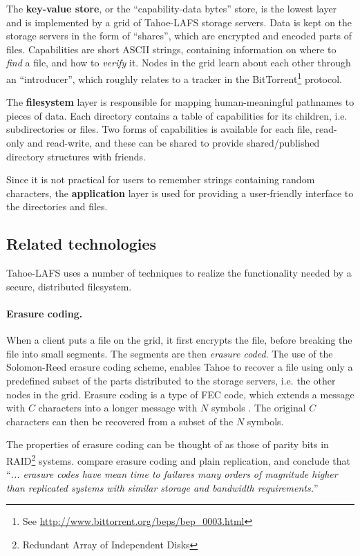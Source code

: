 \documentclass[english,12pt,a4paper]{book}
\begin{document}
The \textbf{key-value store}, or the ``capability-data bytes'' store, is the
lowest layer and is implemented by a grid of Tahoe-LAFS storage servers. Data is
kept on the storage servers in the form of ``shares'', which are encrypted and
encoded parts of files. Capabilities are short ASCII strings, containing
information on where to \emph{find} a file, and how to \emph{verify} it.
Nodes in the grid learn about each other through an ``introducer'', which
roughly relates to a tracker in the BitTorrent\footnote{See
\url{http://www.bittorrent.org/beps/bep\_0003.html}} protocol.

The \textbf{filesystem} layer is responsible for mapping human-meaningful
pathnames to pieces of data. Each directory contains a table of capabilities
for its children, i.e. subdirectories or files. Two forms of capabilities is
available for each file, read-only and read-write, and these can be shared to
provide shared/published directory structures with friends.

Since it is not practical for users to remember strings containing random
characters, the \textbf{application} layer is used for providing a user-friendly
interface to the directories and files.

\subsection{Related technologies}

Tahoe-\ac{LAFS} uses a number of techniques to realize the functionality
needed by a secure, distributed filesystem.

\paragraph{Erasure coding.}

When a client puts a file on the grid, it first encrypts the file, before
breaking the file into small segments. The segments are then \emph{erasure
coded}.  The use of the Solomon-Reed erasure coding scheme, enables Tahoe to
recover a file using only a predefined subset of the parts distributed to the
storage servers, i.e. the other nodes in the grid. Erasure coding is a type of
\ac{FEC} code, which extends a message with $C$ characters into a longer message
with $N$ symbols \cite{t_reed-solomon}.  The original $C$ characters can then be
recovered from a subset of the $N$ symbols.

The properties of erasure coding can be thought of as those of parity bits in
RAID\footnote{Redundant Array of Independent Disks} systems. \citet*{t_erasure}
compare erasure coding and plain replication, and conclude that ``\emph{...
erasure codes have mean time to failures many orders of magnitude higher than
replicated systems with similar storage and bandwidth requirements.}''
\end{document}
